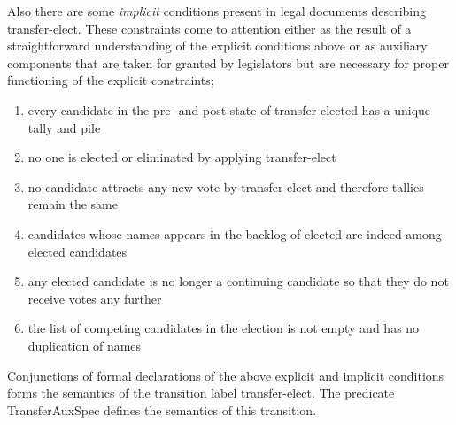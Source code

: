\documentclass[10pt,conference]{IEEEtran}
\begin{document}
Also there are some \emph{implicit} conditions present in legal documents describing transfer-elect. These constraints come to attention either as the result of a straightforward understanding of the explicit conditions above or as   auxiliary components that are taken for granted by legislators but are
necessary for proper functioning of the explicit constraints;
\begin{enumerate}
\item every candidate in the pre- and post-state of transfer-elected has a unique tally and pile
\item no one is elected or eliminated by applying transfer-elect
\item no candidate attracts any new vote by transfer-elect and therefore tallies remain the same
\item candidates whose names appears in the backlog of elected are indeed among elected candidates
\item any elected candidate is no longer a continuing candidate so that they do not receive votes any further
\item the list of competing candidates in the election is not empty and has no duplication of names
\end{enumerate}
Conjunctions of formal declarations of the above explicit and implicit conditions forms the semantics of the transition label transfer-elect.   The predicate TransferAuxSpec defines  the semantics of this transition.
\end{document}
